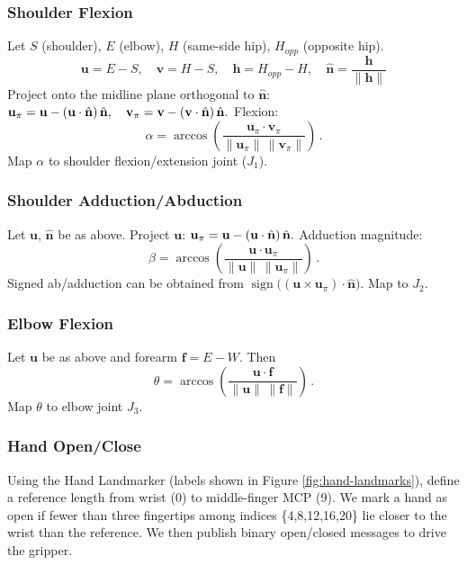 \documentclass[acmsmall, screen]{acmart}
\begin{document}
\subsubsection{Shoulder Flexion}
Let $S$ (shoulder), $E$ (elbow), $H$ (same-side hip), $H_{opp}$ (opposite hip).
\begin{displaymath}
  \mathbf{u}=E-S,\quad \mathbf{v}=H-S,\quad \mathbf{h}=H_{opp}-H,\quad \hat{\mathbf{n}}=\frac{\mathbf{h}}{\lVert\mathbf{h}\rVert}
\end{displaymath}
Project onto the midline plane orthogonal to $\hat{\mathbf{n}}$:
$
\mathbf{u}_\pi=\mathbf{u}-(\mathbf{u}\cdot\hat{\mathbf{n}})\,\hat{\mathbf{n}},\quad
\mathbf{v}_\pi=\mathbf{v}-(\mathbf{v}\cdot\hat{\mathbf{n}})\,\hat{\mathbf{n}}. \\
$
Flexion:
\begin{equation}
\alpha=\arccos \!\left( \frac{\mathbf{u}_\pi \cdot \mathbf{v}_\pi}{\lVert\mathbf{u}_\pi\rVert\, \lVert\mathbf{v}_\pi\rVert} \right)\,.
\end{equation}
Map $\alpha$ to shoulder flexion/extension joint ($J_1$).

\subsubsection{Shoulder Adduction/Abduction}
Let $\mathbf{u}$, $\hat{\mathbf{n}}$ be as above. Project $\mathbf{u}$:
$
\mathbf{u}_\pi=\mathbf{u}-(\mathbf{u}\cdot\hat{\mathbf{n}})\,\hat{\mathbf{n}}.\\
$
Adduction magnitude:
\begin{equation}
\beta=\arccos \!\left( \frac{\mathbf{u}\cdot\mathbf{u}_\pi}{\lVert\mathbf{u}\rVert\, \lVert\mathbf{u}_\pi\rVert} \right)\,.
\end{equation}
Signed ab/adduction can be obtained from $\operatorname{sign}\big((\mathbf{u}\times\mathbf{u}_\pi)\cdot\hat{\mathbf{n}}\big)$. Map to $J_2$.

\subsubsection{Elbow Flexion}
Let $\mathbf{u}$ be as above and forearm $\mathbf{f}=E-W$. Then
\begin{equation}
\theta=\arccos \!\left( \frac{\mathbf{u}\cdot\mathbf{f}}{\lVert\mathbf{u}\rVert\, \lVert\mathbf{f}\rVert} \right)\,.
\end{equation}
Map $\theta$ to elbow joint $J_3$.

\subsubsection{Hand Open/Close}
Using the Hand Landmarker (labels shown in Figure \ref{fig:hand-landmarks}), define a reference length from wrist (0) to middle-finger MCP (9). We mark a hand as open if fewer than three fingertips among indices \{4,8,12,16,20\} lie closer to the wrist than the reference. We then publish binary open/closed messages to drive the gripper.
\end{document}

